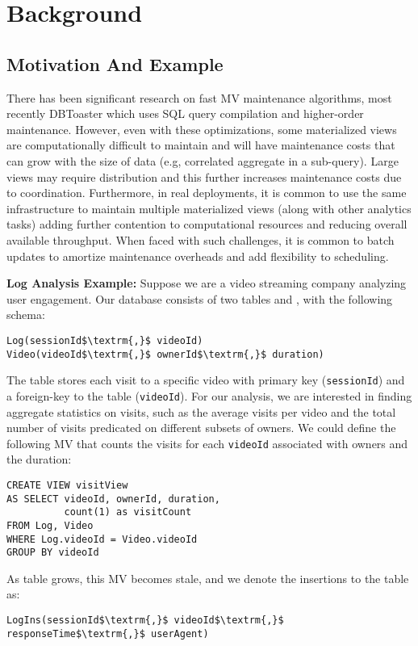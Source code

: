 \section{Background}\label{sec-background}

\subsection{Motivation And Example}\label{subsec-inc}
There has been significant research on fast MV maintenance algorithms, most recently DBToaster \cite{DBLP:journals/vldb/KochAKNNLS14} which uses SQL query compilation and higher-order maintenance.
However, even with these optimizations, some materialized views are computationally difficult to maintain and will have maintenance costs that can grow with the size of data (e.g, correlated aggregate in a sub-query).
Large views may require distribution and this further increases maintenance costs due to coordination.
Furthermore, in real deployments, it is common to use the same infrastructure to maintain multiple materialized views (along with other analytics tasks) adding further contention to computational resources and reducing overall available throughput. 
When faced with such challenges, it is common to batch updates to amortize maintenance overheads and add flexibility to scheduling.

\noindent \textbf{Log Analysis Example: } 
Suppose we are a video streaming company analyzing user engagement.
Our database consists of two tables  and , with the following schema:
\begin{lstlisting}[mathescape,basicstyle={\scriptsize}]
Log(sessionId$\textrm{,}$ videoId)
Video(videoId$\textrm{,}$ ownerId$\textrm{,}$ duration)
\end{lstlisting}
The  table stores each visit to a specific video with primary key (\texttt{sessionId}) and a foreign-key to the  table (\texttt{videoId}).
For our analysis, we are interested in finding aggregate statistics on visits, such as the average visits per video and the total number of visits predicated on different subsets of owners. 
We could define the following MV that counts the visits for each \texttt{videoId} associated with owners and the duration: 
\begin{lstlisting}[mathescape,basicstyle={\scriptsize}]
CREATE VIEW visitView
AS SELECT videoId, ownerId, duration,
          count(1) as visitCount
FROM Log, Video
WHERE Log.videoId = Video.videoId
GROUP BY videoId
\end{lstlisting}
As  table grows, this MV becomes stale, and we denote the insertions to the table as:
\begin{lstlisting}[mathescape,basicstyle={\scriptsize}]
LogIns(sessionId$\textrm{,}$ videoId$\textrm{,}$ responseTime$\textrm{,}$ userAgent)
\end{lstlisting}

